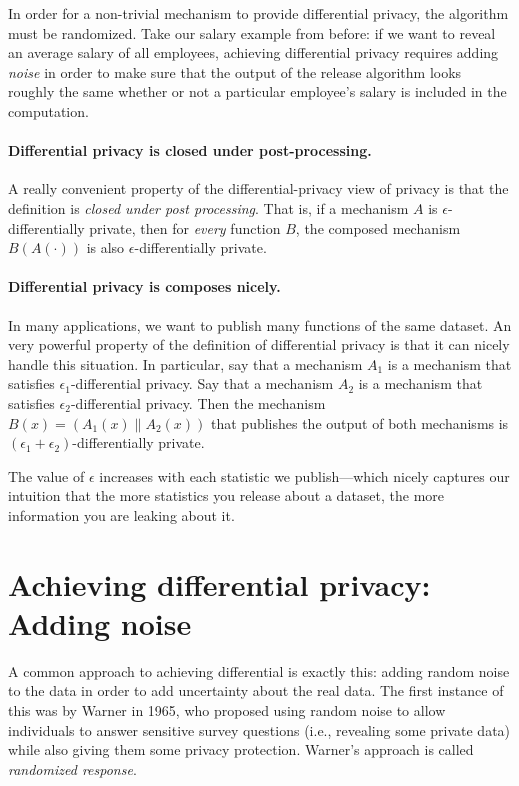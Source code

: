 In order for a non-trivial mechanism to provide differential privacy, the algorithm must be randomized. Take our salary example from before: if we want to reveal an average salary of all employees, achieving differential privacy requires adding \emph{noise} in order to make sure that the output of the 
release algorithm looks roughly the same whether or not a particular employee's 
salary is included in the computation.

\paragraph{Differential privacy is closed under post-processing.}
A really convenient property of the differential-privacy view
of privacy is that the definition is \emph{closed under post processing}.
That is, if a mechanism $A$ is $\epsilon$-differentially private,
then for \emph{every} function $B$, the composed mechanism $B(A(\cdot))$
is also $\epsilon$-differentially private. 

\paragraph{Differential privacy is composes nicely.}
In many applications, we want to publish many functions of the same
dataset.
An very powerful property of the definition of differential
privacy is that it can nicely handle this situation.
In particular, say that a mechanism $A_1$ is a mechanism that
satisfies $\epsilon_1$-differential privacy.
Say that a mechanism $A_2$ is a mechanism that
satisfies $\epsilon_2$-differential privacy.
Then the mechanism $B(x) = (A_1(x) \| A_2(x))$
that publishes the output of both mechanisms is
$(\epsilon_1 + \epsilon_2)$-differentially private.

The value of $\epsilon$ increases with each statistic
we publish---which nicely captures our intuition that
the more statistics you release about a dataset,
the more information you are leaking about it.

\section{Achieving differential privacy: Adding noise}
A common approach to achieving differential is
exactly this: adding random noise to the data in
order to add uncertainty about the real data. The
first instance of this was by Warner in 1965, who
proposed using random noise to allow individuals
to answer sensitive survey questions (i.e.,
revealing some private data) while also giving
them some privacy protection.
Warner's approach is called \emph{randomized response}.

